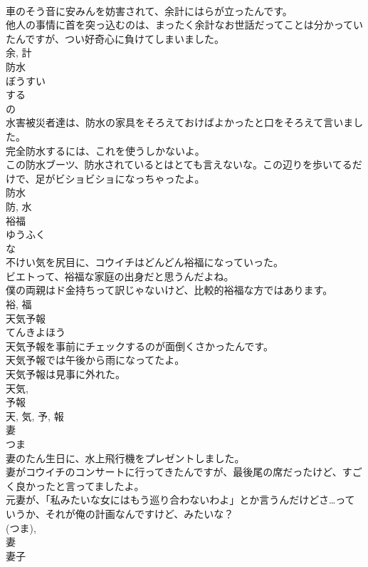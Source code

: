 \documentclass[8pt]{extreport}
\begin{document}
\begin{CJK}{UTF8}{min}
\\	車のそう音に安みんを妨害されて、余計にはらが立ったんです。	
\\	他人の事情に首を突っ込むのは、まったく余計なお世話だってことは分かっていたんですが、つい好奇心に負けてしまいました。	
\\	余, 計	
\\	防水	
\\	ぼうすい	
\\	する 
\\	の 
\\	水害被災者達は、防水の家具をそろえておけばよかったと口をそろえて言いました。	
\\	完全防水するには、これを使うしかないよ。	
\\	この防水ブーツ、防水されているとはとても言えないな。この辺りを歩いてるだけで、足がビショビショになっちゃったよ。	
\\	防水 
\\	防, 水	
\\	裕福	
\\	ゆうふく	
\\	な 
\\	不けい気を尻目に、コウイチはどんどん裕福になっていった。	
\\	ビエトって、裕福な家庭の出身だと思うんだよね。	
\\	僕の両親はド金持ちって訳じゃないけど、比較的裕福な方ではあります。	
\\	裕, 福	
\\	天気予報	
\\	てんきよほう	
\\	天気予報を事前にチェックするのが面倒くさかったんです。	
\\	天気予報では午後から雨になってたよ。	
\\	天気予報は見事に外れた。	
\\	天気, 
\\	予報 
\\	天, 気, 予, 報	
\\	妻	
\\	つま	
\\	妻のたん生日に、水上飛行機をプレゼントしました。	
\\	妻がコウイチのコンサートに行ってきたんですが、最後尾の席だったけど、すごく良かったと言ってましたよ。	
\\	元妻が、「私みたいな女にはもう巡り合わないわよ」とか言うんだけどさ…っていうか、それが俺の計画なんですけど、みたいな？	
\\	(つま), 
\\	妻	
\\	妻子	

\end{CJK}
\end{document}
